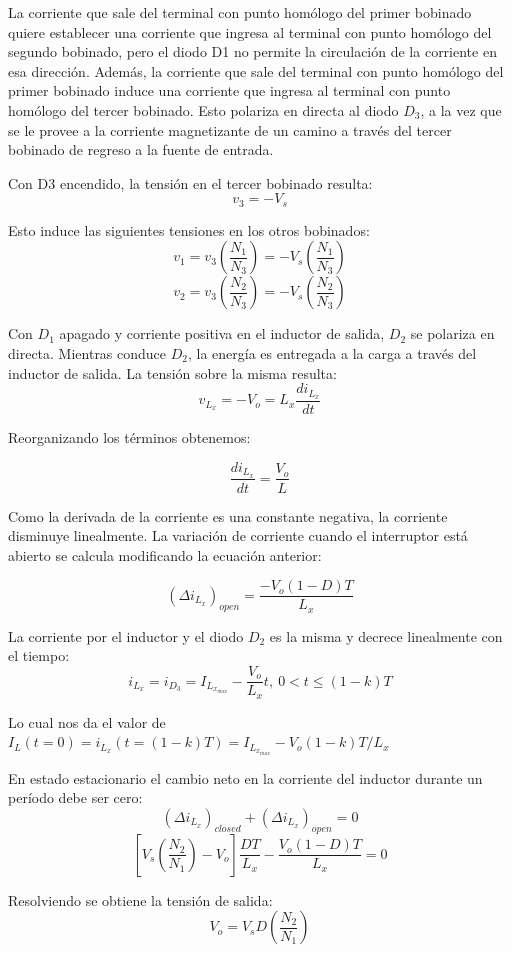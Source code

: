 La corriente que sale del terminal con punto homólogo del primer bobinado quiere establecer una corriente que ingresa al terminal 
con punto homólogo del segundo bobinado, pero el diodo D1 no permite la circulación de la corriente en esa dirección. 
Además, la corriente que sale del terminal con punto homólogo del primer bobinado induce una corriente que ingresa al terminal 
con punto homólogo del tercer bobinado. Esto polariza en directa al diodo $D_3$, a la vez que 
se le provee a la corriente magnetizante de un camino a través del tercer bobinado de regreso a la fuente de entrada. 

Con D3 encendido, la tensión en el tercer bobinado resulta:
$$ v_3=-V_s $$

Esto induce las siguientes tensiones en los otros bobinados:
$$ v_1=v_3\left(\frac{N_1}{N_3}\right)=-V_s\left(\frac{N_1}{N_3}\right) $$
$$ v_2=v_3\left(\frac{N_2}{N_3}\right)=-V_s\left(\frac{N_2}{N_3}\right) $$

Con $D_1$ apagado y corriente positiva en el inductor de salida, $D_2$ se polariza en directa. 
Mientras conduce $D_2$, la energía es entregada a la carga a través del inductor de salida. 
La tensión sobre la misma resulta:
$$ v_{L_x}=-V_o=L_x\frac{di_{L_x}}{dt} $$

Reorganizando los términos obtenemos:

$$ \frac{di_{L_x}}{dt}=\frac{V_o}{L} $$

Como la derivada de la corriente es una constante negativa, la corriente disminuye linealmente. 
La variación de corriente cuando el interruptor está abierto se calcula modificando la ecuación anterior:

$$ (\Delta i_{L_x})_{open}=\frac{-V_o(1-D)T}{L_x} $$

La corriente por el inductor y el diodo $D_2$ es la misma y decrece linealmente con el tiempo:
$$ i_{L_x}=i_{D_3}=I_{L_{x_{max}}}-\frac{V_o}{L_x}t,\ 0<t\leq (1-k)T $$

Lo cual nos da el valor de $I_L(t=0)=i_{L_x}(t=(1-k)T)=I_{L_{x_{max}}}-V_o(1-k)T/L_x$

En estado estacionario el cambio neto en la corriente del inductor durante un período debe ser cero:
$$ (\Delta i_{L_x})_{closed}+(\Delta i_{L_x})_{open}=0 $$
$$ \left[V_s\left(\frac{N_2}{N_1}\right)-V_o\right]\frac{DT}{L_x}-\frac{V_o(1-D)T}{L_x}=0 $$

Resolviendo se obtiene la tensión de salida:
$$ V_o=V_sD\left(\frac{N_2}{N_1}\right) $$

